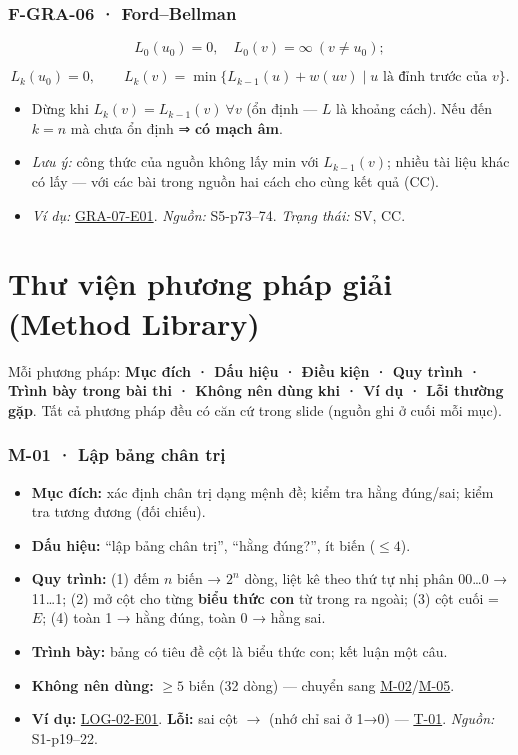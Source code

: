 \documentclass[
  10pt,
  twoside,openany]{book}
\providecommand{\tightlist}{%
  \setlength{\itemsep}{0pt}\setlength{\parskip}{0pt}}
\begin{document}
\hypertarget{F-GRA-06}{%
\subsection{F-GRA-06 · Ford--Bellman}\label{F-GRA-06}}

\[
L_0(u_0)=0,\quad L_0(v)=\infty\ (v\ne u_0);
\]

\[
L_k(u_0)=0,\qquad L_k(v)=\min\{L_{k-1}(u)+w(uv)\mid u\text{ là đỉnh trước của } v\}.
\]

\begin{itemize}
\tightlist
\item
  Dừng khi \(L_k(v)=L_{k-1}(v)\ \forall v\) (ổn định --- \(L\) là khoảng
  cách). Nếu đến \(k=n\) mà chưa ổn định ⇒ \textbf{có mạch âm}.
\item
  \emph{Lưu ý:} công thức của nguồn không lấy min với \(L_{k-1}(v)\);
  nhiều tài liệu khác có lấy --- với các bài trong nguồn hai cách cho
  cùng kết quả (CC).
\item
  \emph{Ví dụ:} \protect\hyperlink{GRA-07-E01}{GRA-07-E01}.
  \emph{Nguồn:} S5-p73--74. \emph{Trạng thái:} SV, CC.
\end{itemize}

\hypertarget{methods}{%
\chapter{Thư viện phương pháp giải (Method Library)}\label{methods}}

Mỗi phương pháp: \textbf{Mục đích · Dấu hiệu · Điều kiện · Quy trình ·
Trình bày trong bài thi · Không nên dùng khi · Ví dụ · Lỗi thường gặp}.
Tất cả phương pháp đều có căn cứ trong slide (nguồn ghi ở cuối mỗi mục).

\hypertarget{M-01}{%
\subsection{M-01 · Lập bảng chân trị}\label{M-01}}

\begin{itemize}
\tightlist
\item
  \textbf{Mục đích:} xác định chân trị dạng mệnh đề; kiểm tra hằng
  đúng/sai; kiểm tra tương đương (đối chiếu).
\item
  \textbf{Dấu hiệu:} ``lập bảng chân trị'', ``hằng đúng?'', ít biến
  (\(\le4\)).
\item
  \textbf{Quy trình:} (1) đếm \(n\) biến → \(2^n\) dòng, liệt kê theo
  thứ tự nhị phân 00\ldots0 → 11\ldots1; (2) mở cột cho từng
  \textbf{biểu thức con} từ trong ra ngoài; (3) cột cuối = \(E\); (4)
  toàn 1 → hằng đúng, toàn 0 → hằng sai.
\item
  \textbf{Trình bày:} bảng có tiêu đề cột là biểu thức con; kết luận một
  câu.
\item
  \textbf{Không nên dùng:} \(\ge5\) biến (32 dòng) --- chuyển sang
  \protect\hyperlink{M-02}{M-02}/\protect\hyperlink{M-05}{M-05}.
\item
  \textbf{Ví dụ:} \protect\hyperlink{LOG-02-E01}{LOG-02-E01}.
  \textbf{Lỗi:} sai cột \(\to\) (nhớ chỉ sai ở 1→0) ---
  \protect\hyperlink{T-01}{T-01}. \emph{Nguồn:} S1-p19--22.
\end{itemize}
\end{document}
